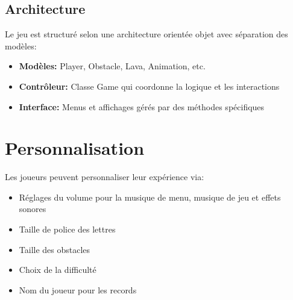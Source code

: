 \documentclass{article}
\begin{document}
\subsection{Architecture}
Le jeu est structuré selon une architecture orientée objet avec séparation des modèles:
\begin{itemize}
    \item \textbf{Modèles:} Player, Obstacle, Lava, Animation, etc.
    \item \textbf{Contrôleur:} Classe Game qui coordonne la logique et les interactions
    \item \textbf{Interface:} Menus et affichages gérés par des méthodes spécifiques
\end{itemize}

\section{Personnalisation}
Les joueurs peuvent personnaliser leur expérience via:
\begin{itemize}
    \item Réglages du volume pour la musique de menu, musique de jeu et effets sonores
    \item Taille de police des lettres
    \item Taille des obstacles
    \item Choix de la difficulté
    \item Nom du joueur pour les records
\end{itemize}
\end{document}
